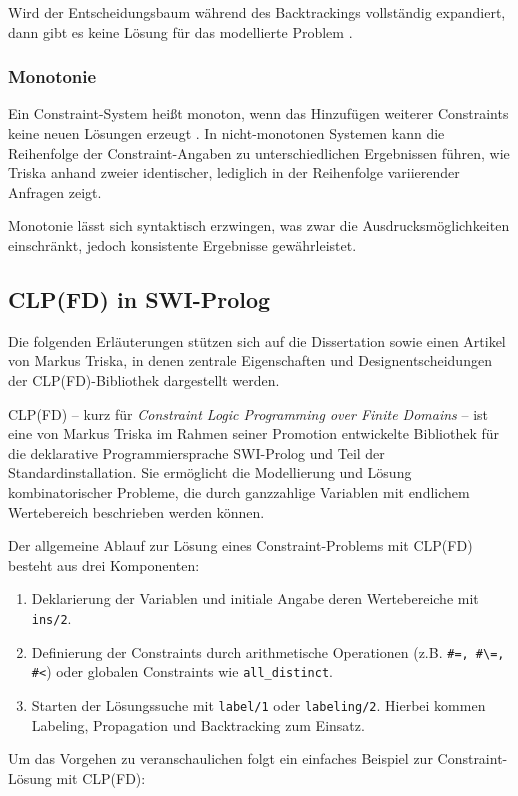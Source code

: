 \documentclass[12pt,a4paper]{article}
\begin{document}
Wird der Entscheidungsbaum während des Backtrackings vollständig expandiert, dann gibt es keine Lösung für das modellierte Problem \cite{clp_book2}.
\subsubsection{Monotonie}
Ein Constraint-System heißt monoton, wenn das Hinzufügen weiterer Constraints keine neuen Lösungen erzeugt \cite{drt}\cite{swi-clpfd-doc}.
In nicht-monotonen Systemen kann die Reihenfolge der Constraint-Angaben zu unterschiedlichen Ergebnissen führen, wie Triska \cite[S. 37]{drt} anhand zweier identischer, lediglich in der Reihenfolge variierender Anfragen zeigt.

Monotonie lässt sich syntaktisch erzwingen, was zwar die Ausdrucksmöglichkeiten einschränkt, jedoch konsistente Ergebnisse gewährleistet.
\subsection{CLP(FD) in SWI-Prolog}
\label{sec:clpfd}
Die folgenden Erläuterungen stützen sich auf die Dissertation \cite{drt} sowie einen Artikel \cite{clpfd} von Markus Triska, in denen zentrale Eigenschaften und Designentscheidungen der CLP(FD)-Bibliothek dargestellt werden.

CLP(FD) -- kurz für \emph{Constraint Logic Programming over Finite Domains} -- ist eine von Markus Triska im Rahmen seiner Promotion entwickelte Bibliothek für die deklarative Programmiersprache SWI-Prolog und Teil der Standardinstallation. 
Sie ermöglicht die Modellierung und Lösung kombinatorischer Probleme, die durch ganzzahlige Variablen mit endlichem Wertebereich beschrieben werden können.

Der allgemeine Ablauf zur Lösung eines Constraint-Problems mit CLP(FD) besteht aus drei Komponenten:
\begin{enumerate}
    \item Deklarierung der Variablen und initiale Angabe deren Wertebereiche mit \texttt{ins/2}.
    \item Definierung der Constraints durch arithmetische Operationen (z.B. \texttt{\#=, \#\textbackslash=, \#<}) oder globalen Constraints wie \texttt{all\_distinct}.
    \item Starten der Lösungssuche mit \texttt{label/1} oder \texttt{labeling/2}. Hierbei kommen Labeling, Propagation und Backtracking zum Einsatz.
\end{enumerate}

\noindent
Um das Vorgehen zu veranschaulichen folgt ein einfaches Beispiel zur Constraint-Lösung mit CLP(FD):
\end{document}

